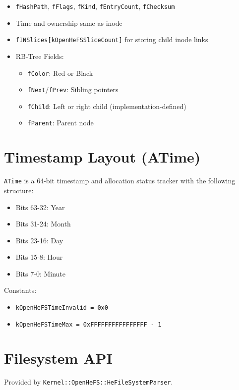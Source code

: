 \documentclass{article}
\begin{document}
\begin{itemize}
  \item \texttt{fHashPath}, \texttt{fFlags}, \texttt{fKind}, \texttt{fEntryCount}, \texttt{fChecksum}
  \item Time and ownership same as inode
  \item \texttt{fINSlices[kOpenHeFSSliceCount]} for storing child inode links
\item RB-Tree Fields:
\begin{itemize}
  \item \texttt{fColor}: Red or Black
  \item \texttt{fNext}/\texttt{fPrev}: Sibling pointers
  \item \texttt{fChild}: Left or right child (implementation-defined)
  \item \texttt{fParent}: Parent node
\end{itemize}

\end{itemize}

\section{Timestamp Layout (ATime)}\label{sec:timestamp-layout-(atime)}

\texttt{ATime} is a 64-bit timestamp and allocation status tracker with the following structure:

\begin{itemize}
  \item Bits 63-32: Year
  \item Bits 31-24: Month
  \item Bits 23-16: Day
  \item Bits 15-8: Hour
  \item Bits 7-0: Minute
\end{itemize}

Constants:
\begin{itemize}
  \item \texttt{kOpenHeFSTimeInvalid = 0x0}
  \item \texttt{kOpenHeFSTimeMax = 0xFFFFFFFFFFFFFFFF - 1}
\end{itemize}

\section{Filesystem API}\label{sec:filesystem-api}

Provided by \texttt{Kernel::OpenHeFS::HeFileSystemParser}.
\end{document}
